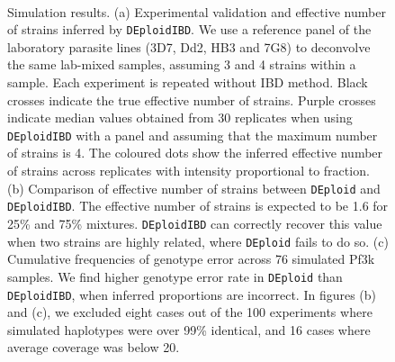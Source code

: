 \documentclass[9pt,lineno]{elife}
\begin{document}
\begin{figure}[htp]
\begin{center}
{{      \\
    }
  }
  \caption{Simulation results. (a) Experimental validation and effective number of strains inferred by {\tt DEploidIBD}. We use a reference panel of the laboratory parasite lines (3D7, Dd2, HB3 and 7G8) to deconvolve the same lab-mixed samples, assuming 3 and 4 strains within a sample. Each experiment is repeated without IBD method. Black crosses indicate the true effective number of strains. Purple crosses indicate median values obtained from 30 replicates when using {\tt DEploidIBD} with a panel and assuming that the maximum number of strains is 4. The coloured dots show the inferred effective number of strains across replicates with intensity proportional to fraction. (b) Comparison of effective number of strains between \texttt{DEploid} and \texttt{DEploidIBD}. The effective number of strains is expected to be 1.6 for 25\% and 75\% mixtures. \texttt{DEploidIBD} can correctly recover this value when two strains are highly related, where \texttt{DEploid} fails to do so. (c) Cumulative frequencies of genotype error across 76 simulated Pf3k samples. We find higher genotype error rate in \texttt{DEploid} than \texttt{DEploidIBD}, when inferred proportions are incorrect. In figures (b) and (c), we excluded eight cases out of the 100 experiments where simulated haplotypes were over 99\% identical, and 16 cases where average coverage was below 20.
}
\end{center}
\end{figure}
\end{document}

